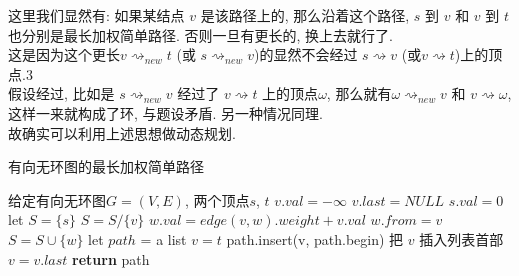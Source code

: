 \documentclass[UTF8]{article}
\begin{document}
\noindent 这里我们显然有: 如果某结点 $v$ 是该路径上的, 那么沿着这个路径, $s$ 到 $v$ 和 $v$ 到 $t$ 也分别是最长加权简单路径. 否则一旦有更长的, 换上去就行了. \\
这是因为这个更长$v\rightsquigarrow_{new} t$ (或 $s\rightsquigarrow_{new} v$)的显然不会经过 $s\rightsquigarrow v$ (或$v\rightsquigarrow t$)上的顶点.3 \\
假设经过, 比如是 $s \rightsquigarrow_{new}v$ 经过了 $v\rightsquigarrow t$ 上的顶点$\omega$, 那么就有$\omega\rightsquigarrow_{new} v$ 和 $v\rightsquigarrow \omega$, 这样一来就构成了环, 与题设矛盾. 另一种情况同理.\\
故确实可以利用上述思想做动态规划.\\
\begin{minipage}{\linewidth*6/7}
	\begin{algorithm}[H]
		\caption{有向无环图的最长加权简单路径}
		\begin{algorithmic}[1] %
			\Require 给定有向无环图$G=(V,E)$, 两个顶点$s$, $t$
					\State $v.val=-\infty$
					\State $v.last = NULL$
				\EndFor
				\State $s.val = 0$
				\State let $S = \{s\}$
						\State $S = S/\{v\}$
								\State $w.val = edge(v,w).weight + v.val$
								\State $w.from = v$
							\EndIf
							\State $S = S\cup \{w\}$
						\EndFor
					\EndFor
				\EndWhile
				\State let $path$ = a list
				\State $v = t$
					\State path.insert(v, path.begin) \Comment 把 $v$ 插入列表首部
					\State $v = v.last$
				\EndWhile
				\State \textbf{return} path
				
			\EndFunction
		\end{algorithmic}
	\end{algorithm}
\end{minipage}

\newpage
\end{document}
